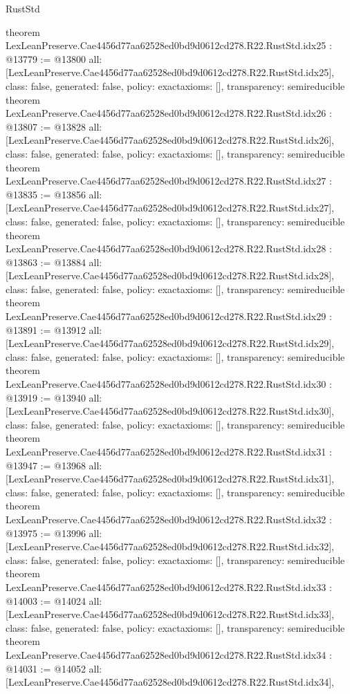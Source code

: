 \begin{lexlean}{RustStd}
\begin{coremodule}
{}
theorem LexLeanPreserve.Cae4456d77aa62528ed0bd9d0612cd278.R22.RustStd.idx25 : @13779 := @13800 {
  all: [LexLeanPreserve.Cae4456d77aa62528ed0bd9d0612cd278.R22.RustStd.idx25],
  class: false,
  generated: false,
  policy: exact{axioms: []},
  transparency: semireducible
}
theorem LexLeanPreserve.Cae4456d77aa62528ed0bd9d0612cd278.R22.RustStd.idx26 : @13807 := @13828 {
  all: [LexLeanPreserve.Cae4456d77aa62528ed0bd9d0612cd278.R22.RustStd.idx26],
  class: false,
  generated: false,
  policy: exact{axioms: []},
  transparency: semireducible
}
theorem LexLeanPreserve.Cae4456d77aa62528ed0bd9d0612cd278.R22.RustStd.idx27 : @13835 := @13856 {
  all: [LexLeanPreserve.Cae4456d77aa62528ed0bd9d0612cd278.R22.RustStd.idx27],
  class: false,
  generated: false,
  policy: exact{axioms: []},
  transparency: semireducible
}
theorem LexLeanPreserve.Cae4456d77aa62528ed0bd9d0612cd278.R22.RustStd.idx28 : @13863 := @13884 {
  all: [LexLeanPreserve.Cae4456d77aa62528ed0bd9d0612cd278.R22.RustStd.idx28],
  class: false,
  generated: false,
  policy: exact{axioms: []},
  transparency: semireducible
}
theorem LexLeanPreserve.Cae4456d77aa62528ed0bd9d0612cd278.R22.RustStd.idx29 : @13891 := @13912 {
  all: [LexLeanPreserve.Cae4456d77aa62528ed0bd9d0612cd278.R22.RustStd.idx29],
  class: false,
  generated: false,
  policy: exact{axioms: []},
  transparency: semireducible
}
theorem LexLeanPreserve.Cae4456d77aa62528ed0bd9d0612cd278.R22.RustStd.idx30 : @13919 := @13940 {
  all: [LexLeanPreserve.Cae4456d77aa62528ed0bd9d0612cd278.R22.RustStd.idx30],
  class: false,
  generated: false,
  policy: exact{axioms: []},
  transparency: semireducible
}
theorem LexLeanPreserve.Cae4456d77aa62528ed0bd9d0612cd278.R22.RustStd.idx31 : @13947 := @13968 {
  all: [LexLeanPreserve.Cae4456d77aa62528ed0bd9d0612cd278.R22.RustStd.idx31],
  class: false,
  generated: false,
  policy: exact{axioms: []},
  transparency: semireducible
}
theorem LexLeanPreserve.Cae4456d77aa62528ed0bd9d0612cd278.R22.RustStd.idx32 : @13975 := @13996 {
  all: [LexLeanPreserve.Cae4456d77aa62528ed0bd9d0612cd278.R22.RustStd.idx32],
  class: false,
  generated: false,
  policy: exact{axioms: []},
  transparency: semireducible
}
theorem LexLeanPreserve.Cae4456d77aa62528ed0bd9d0612cd278.R22.RustStd.idx33 : @14003 := @14024 {
  all: [LexLeanPreserve.Cae4456d77aa62528ed0bd9d0612cd278.R22.RustStd.idx33],
  class: false,
  generated: false,
  policy: exact{axioms: []},
  transparency: semireducible
}
theorem LexLeanPreserve.Cae4456d77aa62528ed0bd9d0612cd278.R22.RustStd.idx34 : @14031 := @14052 {
  all: [LexLeanPreserve.Cae4456d77aa62528ed0bd9d0612cd278.R22.RustStd.idx34],
}
\end{coremodule}
\end{lexlean}

